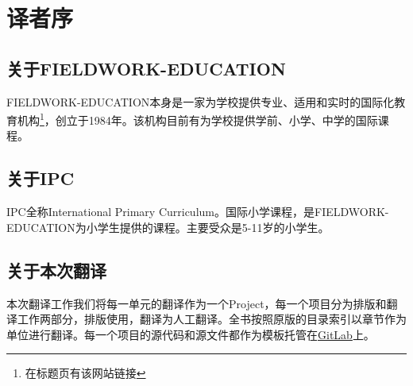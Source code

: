 \chapter{译者序}


\section{关于FIELDWORK-EDUCATION}
     \lettrine[lines=1]{F}{IELDWORK-EDUCATION}本身是一家为学校提供专业、适用和实时的国际化教育机构\footnote{在标题页有该网站链接}，创立于1984年。该机构目前有为学校提供学前、小学、中学的国际课程。\par



\section{关于IPC}
     \lettrine[lines=2]{I}{PC}全称International Primary Curriculum。国际小学课程，是FIELDWORK-EDUCATION为小学生提供的课程。主要受众是5-11岁的小学生。\par



\section{关于本次翻译}
     \lettrine[lines=2]{本}{次翻译工作}我们将每一单元的翻译作为一个Project，每一个项目分为排版和翻译工作两部分，排版使用\LaTeXe，翻译为人工翻译。全书按照原版的目录索引以章节作为单位进行翻译。每一个项目的源代码和源文件都作为模板托管在\href{https://gitlab.com/haotianmichael/LatexTemplate}{GitLab}上。\par
     
     


    
